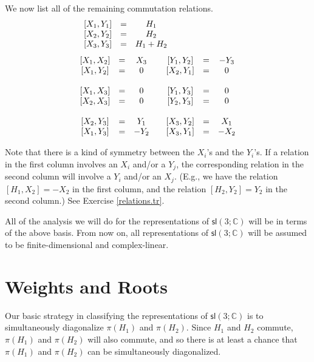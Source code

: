 \documentclass[12pt]{amsbook}
\theoremstyle{plain}
\numberwithin{equation}{chapter}
\numberwithin{theorem}{chapter}
\begin{document}
We now list all of the remaining commutation relations.
\[%
\begin{array}
[c]{ccccccc}%
\left[  X_{1},Y_{1}\right]  & = & H_{1} &  &  &  & \\
\left[  X_{2},Y_{2}\right]  & = & H_{2} &  &  &  & \\
\left[  X_{3},Y_{3}\right]  & = & H_{1}+H_{2} &  & \qquad & \ \ \quad &
\end{array}
\]%
\[%
\begin{array}
[c]{ccccccc}%
\left[  X_{1},X_{2}\right]  & = & X_{3} &  & \left[  Y_{1},Y_{2}\right]  & = &
-Y_{3}\\
\left[  X_{1},Y_{2}\right]  & = & 0 &  & \left[  X_{2},Y_{1}\right]  & = & 0\\
&  &  &  &  &  & \\
\left[  X_{1},X_{3}\right]  & = & 0 &  & \left[  Y_{1},Y_{3}\right]  & = & 0\\
\left[  X_{2},X_{3}\right]  & = & 0 &  & \left[  Y_{2},Y_{3}\right]  & = & 0\\
&  &  &  &  &  & \\
\left[  X_{2},Y_{3}\right]  & = & Y_{1} &  & \left[  X_{3},Y_{2}\right]  & = &
X_{1}\\
\left[  X_{1},Y_{3}\right]  & = & -Y_{2} &  & \left[  X_{3},Y_{1}\right]  &
= & -X_{2}%
\end{array}
\]

Note that there is a kind of symmetry between the $X_{i}$'s and the $Y_{i}$'s.
If a relation in the first column involves an $X_{i}$ and/or a $Y_{j}$, the
corresponding relation in the second column will involve a $Y_{i}$ and/or an
$X_{j}$. (E.g., we have the relation $\left[  H_{1},X_{2}\right]  =-X_{2}$ in
the first column, and the relation $\left[  H_{2},Y_{2}\right]  =Y_{2}$ in the
second column.) See Exercise \ref{relations.tr}.

All of the analysis we will do for the representations of $\mathsf{sl}\left(
3;\mathbb{C}\right)  $ will be in terms of the above basis. From now on, all
representations of $\mathsf{sl}\left(  3;\mathbb{C}\right)  $ will be assumed
to be finite-dimensional and complex-linear.

\section{Weights and Roots}

Our basic strategy in classifying the representations of $\mathsf{sl}\left(
3;\mathbb{C}\right)  $ is to simultaneously diagonalize $\pi(H_{1})$ and
$\pi(H_{2})$. Since $H_{1}$ and $H_{2}$ commute, $\pi(H_{1})$ and $\pi(H_{2})$
will also commute, and so there is at least a chance that $\pi(H_{1})$ and
$\pi(H_{2})$ can be simultaneously diagonalized.
\end{document}
